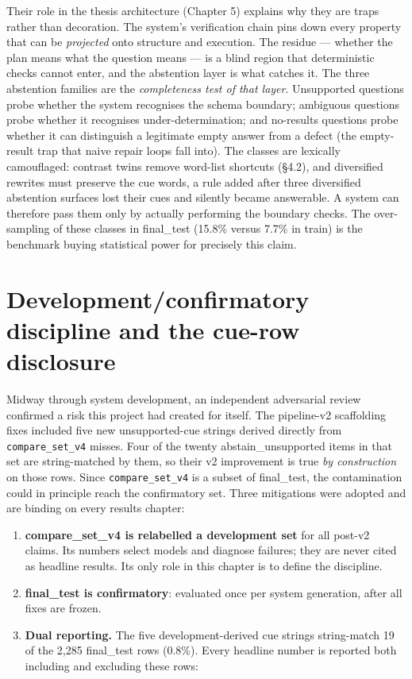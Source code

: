 \documentclass[10pt]{article} %
\begin{document}
Their role in the thesis architecture (Chapter 5) explains why they are traps rather than decoration. The system's verification chain pins down every property that can be \emph{projected} onto structure and execution. The residue --- whether the plan means what the question means --- is a blind region that deterministic checks cannot enter, and the abstention layer is what catches it. The three abstention families are the \emph{completeness test of that layer}. Unsupported questions probe whether the system recognises the schema boundary; ambiguous questions probe whether it recognises under-determination; and no-results questions probe whether it can distinguish a legitimate empty answer from a defect (the empty-result trap that naive repair loops fall into). The classes are lexically camouflaged: contrast twins remove word-list shortcuts (\S4.2), and diversified rewrites must preserve the cue words, a rule added after three diversified abstention surfaces lost their cues and silently became answerable. A system can therefore pass them only by actually performing the boundary checks. The over-sampling of these classes in final\_test (15.8\% versus 7.7\% in train) is the benchmark buying statistical power for precisely this claim.

\section{Development/confirmatory discipline and the cue-row disclosure}\label{sec:development-confirmatory-discipline-and}

Midway through system development, an independent adversarial review confirmed a risk this project had created for itself. The pipeline-v2 scaffolding fixes included five new unsupported-cue strings derived directly from \texttt{compare\_set\_v4} misses. Four of the twenty abstain\_unsupported items in that set are string-matched by them, so their v2 improvement is true \emph{by construction} on those rows. Since \texttt{compare\_set\_v4} is a subset of final\_test, the contamination could in principle reach the confirmatory set. Three mitigations were adopted and are binding on every results chapter:

\begin{enumerate}
\item \textbf{compare\_set\_v4 is relabelled a development set} for all post-v2 claims. Its numbers select models and diagnose failures; they are never cited as headline results. Its only role in this chapter is to define the discipline.
\item \textbf{final\_test is confirmatory}: evaluated once per system generation, after all fixes are frozen.
\item \textbf{Dual reporting.} The five development-derived cue strings string-match 19 of the 2,285 final\_test rows (0.8\%). Every headline number is reported both including and excluding these rows:
\end{enumerate}
\end{document}
